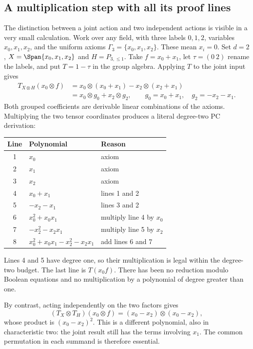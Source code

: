 \documentclass[11pt,a4paper,oneside,openany]{book}
\theoremstyle{definition}\newtheorem{definition}[theorem]{Definition}
\theoremstyle{remark}\newtheorem{remark}[theorem]{Remark}
\numberwithin{equation}{chapter}
\begin{document}
\subsection{A multiplication step with all its proof lines}
The distinction between a joint action and two independent actions is
visible in a very small calculation. Work over any field, with three
labels $0,1,2$, variables $x_0,x_1,x_2$, and the uniform axioms
$\Gamma_3=\{x_0,x_1,x_2\}$. These mean $x_i=0$. Set
$d=2$, $X=\Span\{x_0,x_1,x_2\}$ and $H=P_{3,\le1}$.
Take $f=x_0+x_1$, let $\tau=(0\ 2)$ rename the labels, and put
$T=1-\tau$ in the group algebra. Applying $T$ to the joint input gives
\begin{align*}
 T_{X\otimes H}(x_0\otimes f)
 &=x_0\otimes(x_0+x_1)-x_2\otimes(x_2+x_1)\\
 &=x_0\otimes g_0+x_2\otimes g_2,
 \qquad g_0=x_0+x_1,\quad g_2=-x_2-x_1.
\end{align*}
Both grouped coefficients are derivable linear combinations of the
axioms. Multiplying the two tensor coordinates produces a literal
degree-two PC derivation:
\begin{center}
\begin{tabular}{@{}cll@{}}
\toprule
Line & Polynomial & Reason\\
\midrule
1 & $x_0$ & axiom\\
2 & $x_1$ & axiom\\
3 & $x_2$ & axiom\\
4 & $x_0+x_1$ & lines 1 and 2\\
5 & $-x_2-x_1$ & lines 3 and 2\\
6 & $x_0^2+x_0x_1$ & multiply line 4 by $x_0$\\
7 & $-x_2^2-x_2x_1$ & multiply line 5 by $x_2$\\
8 & $x_0^2+x_0x_1-x_2^2-x_2x_1$ & add lines 6 and 7\\
\bottomrule
\end{tabular}
\end{center}
Lines 4 and 5 have degree one, so their multiplication is legal within
the degree-two budget. The last line is $T(x_0f)$. There has been no
reduction modulo Boolean equations and no multiplication by a
polynomial of degree greater than one.

By contrast, acting independently on the two factors gives
\[
 (T_X\otimes T_H)(x_0\otimes f)
       =(x_0-x_2)\otimes(x_0-x_2),
\]
whose product is $(x_0-x_2)^2$. This is a different polynomial, also in
characteristic two: the joint result still has the terms involving
$x_1$. The common permutation in each summand is therefore essential.
\end{document}
